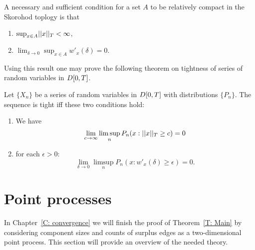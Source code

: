 \begin{theorem} \label{T: AA in DT}
	A necessary and sufficient condition for a set $A$ to be relatively compact in the Skorohod toplogy is that
	\begin{enumerate}
		\item $\sup_{x \in A} \norm{x}_T < \infty$,
		\item $\lim_{\delta \rightarrow 0} \sup_{x \in A} w'_x(\delta) = 0$.
	\end{enumerate}
\end{theorem}

Using this result one may prove the following theorem on tightness of series of random variables in $D[0, T]$.

\begin{theorem} \label{T: tightness in DT}
	Let $\{X_n\}$ be a series of random variables in $D[0, T]$ with distributions $\{P_n\}$.
	The sequence is tight iff these two conditions hold:
	\begin{enumerate}
		\item We have
		\begin{equation}
		\lim_{c \rightarrow \infty} \limsup_n P_n(x: ||x||_T \geq c) = 0	
		\end{equation}
		\item for each $\epsilon > 0$:
		\begin{equation}
			\lim_{\delta \rightarrow 0} \limsup_n P_n(x: w'_x(\delta) \geq \epsilon ) = 0.
		\end{equation}
	\end{enumerate}
\end{theorem}


\section{Point processes} \label{S: point processes}

In Chapter~\ref{C: convergence} we will finish the proof of Theorem~\ref{T: Main}
by considering component sizes and counts of surplus edges as a two-dimensional point process.
This section will provide an overview of the needed theory.

